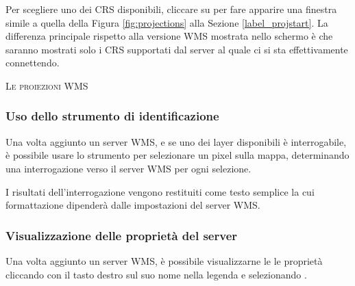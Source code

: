 Per scegliere uno dei CRS disponibili, cliccare su  per fare
apparire una finestra simile a quella della Figura \ref{fig:projections} alla
Sezione \ref{label_projstart}.
La differenza principale rispetto alla versione WMS mostrata nello schermo è
che saranno mostrati solo i CRS supportati dal server al quale ci si sta
effettivamente connettendo.


\begin{Tip}[ht]\caption{\textsc{Le proiezioni WMS}}
\end{Tip}


\subsubsection{Uso dello strumento di identificazione}\label{sec:ogc-wms-identify}

Una volta aggiunto un server WMS, e se uno dei layer disponibili è
interrogabile, è possibile usare lo strumento
 per selezionare un pixel
sulla mappa, determinando una interrogazione verso il server WMS per ogni
selezione.

I risultati dell'interrogazione vengono restituiti come testo semplice la cui
formattazione dipenderà dalle impostazioni del server WMS.


\subsubsection{Visualizzazione delle proprietà del server}\label{sec:ogc-wms-properties}

Una volta aggiunto un server WMS, è possibile visualizzarne le le proprietà
cliccando con il tasto destro sul suo nome nella legenda e selezionando
.


\label{sec:ogc-wms-properties-metadata}

